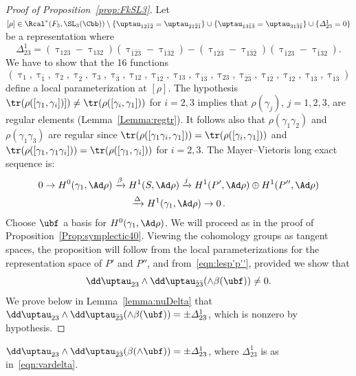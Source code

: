 \begin{proof}[Proof of Proposition~\ref{prop:FkSL3}]
Let $[\rho]\in \Rcal^*(F_3,\SL_3(\Cbb))\setminus \{ \uptau_{12\bar 1\bar{2}}= \uptau_{21\bar 2\bar 1} \}\cup
\{ \uptau_{13\bar 1\bar{3}}= \uptau_{31\bar 3\bar 1} \} \cup\{
\varDelta^1_{23} = 0\}$ be a representation where
\begin{equation}\label{eqn:vardelta}
\varDelta^1_{23} = (\uptau_{123}-\uptau_{132}) (\uptau_{\bar 1\bar 2\bar 3}-\uptau_{\bar 1\bar 3\bar 2}) - (\uptau_{1\bar 2\bar 3}-\uptau_{1\bar 3\bar 2}) (\uptau_{\bar 1 2 3}-\uptau_{\bar 1 3 2}).
\end{equation}
We have to show that the 16 functions
\[
(\uptau_1, \uptau_{\bar 1},\uptau_2, \uptau_{\bar 2},\uptau_3, \uptau_{\bar 3}, \uptau_{12}, \uptau_{\bar 1\bar 2}, \uptau_{13}, \uptau_{\bar 1\bar 3},
\uptau_{23}, \uptau_{\bar 2\bar 3},
\uptau_{1\bar 2}, \uptau_{\bar 1 2}, \uptau_{1\bar 3}, \uptau_{\bar 1 3})
\]
define a local parameterization at $[\rho]$. The hypothesis $\tr(\rho([\gamma_1,\gamma_i])])\neq \tr(\rho([\gamma_i,\gamma_1]))$ for $i=2,3$ implies that $\rho(\gamma_j)$, $j=1,2,3$, are regular elements (Lemma~\ref{Lemma:regtr}). It follows also that $\rho(\gamma_{1}\gamma_2)$ and $\rho(\gamma_{1}\gamma_3)$ are regular since $\tr(\rho([\gamma_1\gamma_i,\gamma_1])) = \tr(\rho([\gamma_i,\gamma_1]))$ and $\tr(\rho([\gamma_1,\gamma_1\gamma_i])) = \tr(\rho([\gamma_1,\gamma_i]))$ for $i=2,3$. The Mayer--Vietoris long exact sequence is:
\begin{multline}\label{eqn:lesp'p''}
0\to H^0(\gamma_1,\Ad\rho)
\xrightarrow{\beta} H^1(S,\Ad\rho)
\xrightarrow{j} H^1(P',\Ad\rho)\oplus H^1(P'',\Ad\rho)\\
\xrightarrow{\Delta} H^1(\gamma_1,\Ad\rho)\to 0\,.
\end{multline}
Choose $\ubf$ a basis for $H^0(\gamma_1,\Ad\rho) $. We will proceed as in the proof of Proposition~\ref{Prop:symplectic40}. Viewing the cohomology groups as tangent spaces, the proposition will follow from the local parameterizations for the representation space of $P'$ and $P''$, and from~\eqref{eqn:lesp'p''}, provided we show that
\begin{equation*}
\dd \uptau_{23}\wedge \dd \uptau_ {\bar 2\bar 3} (\wedge \beta(\ubf))\neq 0.
\end{equation*}
We prove below in Lemma~\ref{lemma:nuDelta} that $ \dd \uptau_{23}\wedge \dd \uptau_ {\bar 2\bar 3} (\wedge \beta(\ubf))=\pm \varDelta^1_{23}$, which is nonzero by hypothesis.
\end{proof}
\goodbreak


\begin{lemm}\label{lemma:nuDelta}
$ \dd \uptau_{23}\wedge \dd \uptau_ {\bar 2\bar 3} (\beta(\wedge\ubf))=\pm \varDelta^1_{23}$, where $\varDelta^1_{23}$ is as in~\eqref{eqn:vardelta}.
\end{lemm}

